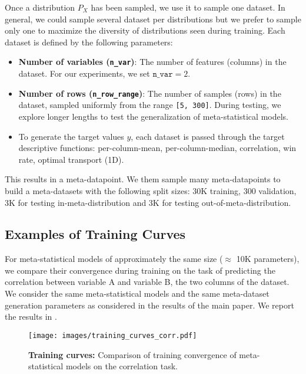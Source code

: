 Once a distribution $P_X$ has been sampled, we use it to sample one dataset. In general, we could sample several dataset per distributions but we prefer to sample only one to maximize the diversity of distributions seen during training. Each dataset is defined by the following parameters:
\begin{itemize}
    \item \textbf{Number of variables (\texttt{n\_var})}: The number of features (columns) in the dataset. For our experiments, we set $\texttt{n\_var} = 2$.
    \item \textbf{Number of rows (\texttt{n\_row\_range})}: The number of samples (rows) in the dataset, sampled uniformly from the range \texttt{[5, 300]}. During testing, we explore longer lengths to test the generalization of meta-statistical models.
    \item To generate the target values $y$, each dataset is passed through the target descriptive functions: per-column-mean, per-column-median, correlation, win rate, optimal transport (1D).
\end{itemize}
This results in a meta-datapoint. We them sample many meta-datapoints to build a meta-datasets with the following split sizes: 30K training, 300 validation, 3K for testing in-meta-distribution and 3K for testing out-of-meta-distribution.

\subsection{Examples of Training Curves}
\label{app:training_curves}
For meta-statistical models of approximately the same size ($\approx$ 10K parameters), we compare their convergence during training on the task of predicting the correlation between variable A and variable B, the two columns of the dataset. We consider the same meta-statistical models and the same meta-dataset generation parameters as considered in the results of the main paper. We report the results in .

\begin{figure}[t]
    \centering
    \texttt{[image: images/training\_curves\_corr.pdf]} %
    \caption{\textbf{Training curves:} Comparison of training convergence of meta-statistical models on the correlation task.}
    \label{fig:training_curves}
\end{figure}


